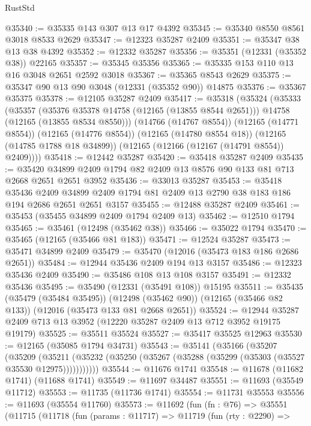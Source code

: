 \begin{lexlean}{RustStd}
\begin{coremodule}
@35340 := @35335 @143 @307 @13 @17 @4392
@35345 := @35340 @8550 @8561 @3018 @8533 @2629
@35347 := @12323 @35287 @2409
@35351 := @35347 @38 @13 @38 @4392
@35352 := @12332 @35287
@35356 := @35351 (@12331 (@35352 @38)) @22165
@35357 := @35345 @35356
@35365 := @35335 @153 @110 @13 @16 @3048 @2651 @2592 @3018
@35367 := @35365 @8543 @2629
@35375 := @35347 @90 @13 @90 @3048 (@12331 (@35352 @90)) @14875
@35376 := @35367 @35375
@35378 := @12105 @35287 @2409
@35417 := @35318
    (@35324
      (@35333
        (@35357
          (@35376 @35378 @14758 (@12165 (@13855 @8544 @2651)))
          @14758
          (@12165 (@13855 @8534 @8550)))
        (@14766 (@14767 @8554))
        (@12165 (@14771 @8554))
        (@12165 (@14776 @8554))
        (@12165 (@14780 @8554 @18))
        (@12165 (@14785 @1788 @18 @34899))
        (@12165 (@12166 (@12167 (@14791 @8554)) @2409))))
@35418 := @12442 @35287
@35420 := @35418 @35287 @2409
@35435 := @35420 @34899 @2409 @1794 @82 @2409 @13 @8576 @90 @133 @81 @713 @2668 @2651 @2651 @3952
@35436 := @33013 @35287
@35453 := @35418
    @35436
    @2409
    @34899
    @2409
    @1794
    @81
    @2409
    @13
    @2790
    @38
    @183
    @186
    @194
    @2686
    @2651
    @2651
    @3157
@35455 := @12488 @35287 @2409
@35461 := @35453 (@35455 @34899 @2409 @1794 @2409 @13)
@35462 := @12510 @1794
@35465 := @35461 (@12498 (@35462 @38))
@35466 := @35022 @1794
@35470 := @35465 (@12165 (@35466 @81 @183))
@35471 := @12524 @35287
@35473 := @35471 @34899 @2409
@35479 := @35470 (@12016 (@35473 @183 @186 @2686 @2651))
@35484 := @12944 @35436 @2409 @194 @13 @3157
@35486 := @12323 @35436 @2409
@35490 := @35486 @108 @13 @108 @3157
@35491 := @12332 @35436
@35495 := @35490 (@12331 (@35491 @108)) @15195
@35511 := @35435
    (@35479 (@35484 @35495))
    (@12498 (@35462 @90))
    (@12165 (@35466 @82 @133))
    (@12016 (@35473 @133 @81 @2668 @2651))
@35524 := @12944 @35287 @2409 @713 @13 @3952 (@12220 @35287 @2409 @13 @712 @3952 @19175 @19179)
@35525 := @35511 @35524
@35527 := @35417 @35525 @12963
@35530 := @12165 (@35085 @1794 @34731)
@35543 := @35141
    (@35166
      (@35207
        (@35209
          (@35211 (@35232 (@35250 (@35267 (@35288 (@35299 (@35303 (@35527 @35530 @12975)))))))))))
@35544 := @11676 @1741
@35548 := @11678 (@11682 @1741) (@11688 @1741)
@35549 := @11697 @34487
@35551 := @11693 (@35549 @11712)
@35553 := @11735 (@11736 @1741)
@35554 := @11731 @35553
@35556 := @11693 (@35554 @11760)
@35573 := @11692
    (fun (fn : @76) =>
    @35551
      (@11715
        (@11718
          (fun (params : @11717) =>
          @11719
            (fun (rty : @2290) =>

\end{coremodule}
\end{lexlean}
